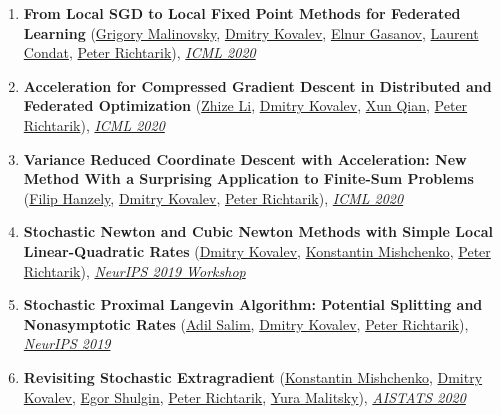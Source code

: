 \begin{enumerate}
\item \textbf{From Local SGD to Local Fixed Point Methods for Federated Learning} (\href{https://scholar.google.com/citations?user=4w2W9KQAAAAJ}{\color{linkcolour}Grigory Malinovsky}, \href{https://www.dmitry-kovalev.com}{\color{linkcolour}Dmitry Kovalev}, \href{https://elnurgasanov.com}{\color{linkcolour}Elnur Gasanov}, \href{https://lcondat.github.io}{\color{linkcolour}Laurent Condat}, \href{https://richtarik.org}{\color{linkcolour}Peter Richtarik}), \href{http://proceedings.mlr.press/v119/malinovskiy20a.html}{\em \color{black}ICML 2020}
\item \textbf{Acceleration for Compressed Gradient Descent in Distributed and Federated Optimization} (\href{https://zhizeli.github.io}{\color{linkcolour}Zhize Li}, \href{https://www.dmitry-kovalev.com}{\color{linkcolour}Dmitry Kovalev}, \href{https://qianxunk.github.io}{\color{linkcolour}Xun Qian}, \href{https://richtarik.org}{\color{linkcolour}Peter Richtarik}), \href{http://proceedings.mlr.press/v119/li20g.html}{\em \color{black}ICML 2020}
\item \textbf{Variance Reduced Coordinate Descent with Acceleration: New Method With a Surprising Application to Finite-Sum Problems} (\href{https://fhanzely.github.io/index.html}{\color{linkcolour}Filip Hanzely}, \href{https://www.dmitry-kovalev.com}{\color{linkcolour}Dmitry Kovalev}, \href{https://richtarik.org}{\color{linkcolour}Peter Richtarik}), \href{http://proceedings.mlr.press/v119/hanzely20b.html}{\em \color{black}ICML 2020}
\item \textbf{Stochastic Newton and Cubic Newton Methods with Simple Local Linear-Quadratic Rates} (\href{https://www.dmitry-kovalev.com}{\color{linkcolour}Dmitry Kovalev}, \href{https://konstmish.github.io}{\color{linkcolour}Konstantin Mishchenko}, \href{https://richtarik.org}{\color{linkcolour}Peter Richtarik}), \href{https://sites.google.com/site/optneurips19/}{\em \color{black}NeurIPS 2019 Workshop}
\item \textbf{Stochastic Proximal Langevin Algorithm: Potential Splitting and Nonasymptotic Rates} (\href{https://adil-salim.github.io}{\color{linkcolour}Adil Salim}, \href{https://www.dmitry-kovalev.com}{\color{linkcolour}Dmitry Kovalev}, \href{https://richtarik.org}{\color{linkcolour}Peter Richtarik}), \href{https://papers.nips.cc/paper/8891-stochastic-proximal-langevin-algorithm-potential-splitting-and-nonasymptotic-rates}{\em \color{black}NeurIPS 2019}
\item \textbf{Revisiting Stochastic Extragradient} (\href{https://konstmish.github.io}{\color{linkcolour}Konstantin Mishchenko}, \href{https://www.dmitry-kovalev.com}{\color{linkcolour}Dmitry Kovalev}, \href{https://shulgin-egor.github.io}{\color{linkcolour}Egor Shulgin}, \href{https://richtarik.org}{\color{linkcolour}Peter Richtarik}, \href{https://scholar.google.com/citations?user=GI_-KjoAAAAJ}{\color{linkcolour}Yura Malitsky}), \href{http://proceedings.mlr.press/v108/mishchenko20a}{\em \color{black}AISTATS 2020}

\end{enumerate}
